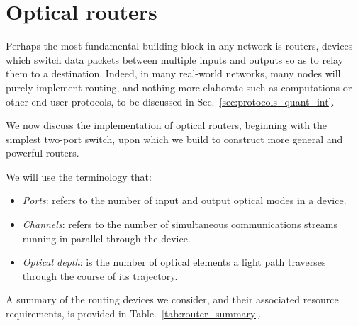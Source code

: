 \documentclass[aps,rmp,twocolumn,amsmath,amssymb,nofootinbib,superscriptaddress,longbibliography,floatfix,table-of-contents,eqsecnum]{revtex4-1}
\renewcommand{\tablename}{ALG.}
\begin{document}
%
%

\section{Optical routers} 

Perhaps the most fundamental building block in any network is routers, devices which switch data packets between multiple inputs and outputs so as to relay them to a destination. Indeed, in many real-world networks, many nodes will purely implement routing, and nothing more elaborate such as computations or other end-user protocols, to be discussed in Sec.~\ref{sec:protocols_quant_int}.

We now discuss the implementation of optical routers, beginning with the simplest two-port switch, upon which we build to construct more general and powerful routers.

We will use the terminology that:
\begin{itemize}
	\item \textit{Ports}: refers to the number of input and output optical modes in a device.
	\item \textit{Channels}: refers to the number of simultaneous communications streams running in parallel through the device.
	\item \textit{Optical depth}: is the number of optical elements a light path traverses through the course of its trajectory.
\end{itemize}

A summary of the routing devices we consider, and their associated resource requirements, is provided in Table.~\ref{tab:router_summary}.

\renewcommand{\tablename}{TABLE}
\end{document}

